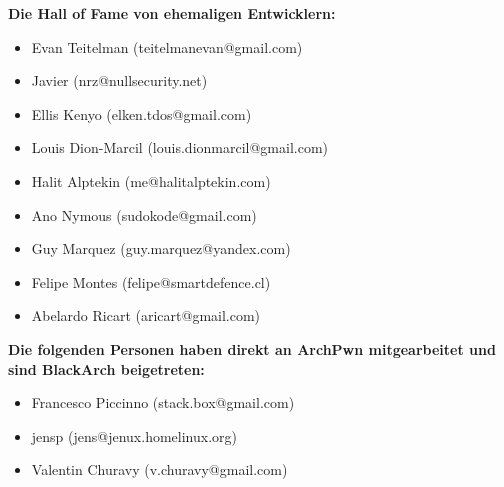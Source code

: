 \textbf{Die Hall of Fame von ehemaligen Entwicklern:}
\begin{itemize}
	\item Evan Teitelman (teitelmanevan@gmail.com)
	\item Javier (nrz@nullsecurity.net)
	\item Ellis Kenyo (elken.tdos@gmail.com)
	\item Louis Dion-Marcil (louis.dionmarcil@gmail.com)
	\item Halit Alptekin (me@halitalptekin.com)
	\item Ano Nymous (sudokode@gmail.com)
	\item Guy Marquez (guy.marquez@yandex.com)
	\item Felipe Montes (felipe@smartdefence.cl)
	\item Abelardo Ricart (aricart@gmail.com)
\end{itemize}

\textbf{Die folgenden Personen haben direkt an ArchPwn mitgearbeitet und sind BlackArch beigetreten:}
\begin{itemize}
\item Francesco Piccinno (stack.box@gmail.com)
\item jensp (jens@jenux.homelinux.org)
\item Valentin Churavy (v.churavy@gmail.com)
\end{itemize}

